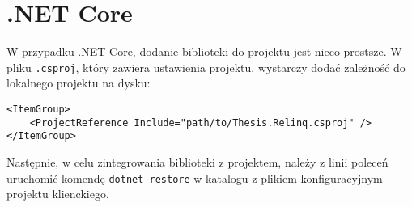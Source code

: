 \section{.NET Core}
W przypadku .NET Core, dodanie biblioteki do projektu jest nieco prostsze. W pliku \texttt{.csproj}, który zawiera ustawienia projektu, wystarczy dodać zależność do lokalnego projektu na dysku:

\begin{lstlisting}
<ItemGroup>
    <ProjectReference Include="path/to/Thesis.Relinq.csproj" />
</ItemGroup>
\end{lstlisting}

Następnie, w celu zintegrowania biblioteki z projektem, należy z linii poleceń uruchomić komendę \texttt{dotnet restore} w katalogu z plikiem konfiguracyjnym projektu klienckiego.